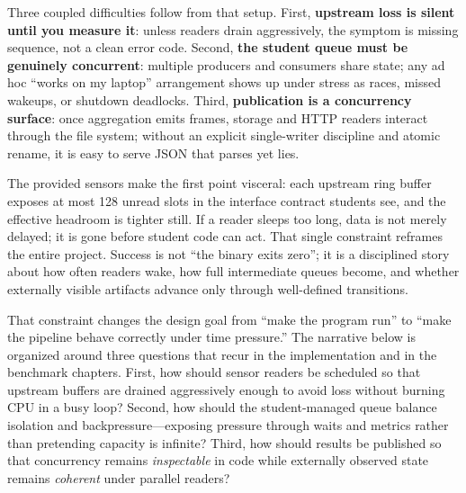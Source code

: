 \documentclass[11pt]{article}
\begin{document}
Three coupled difficulties follow from that setup. First, \textbf{upstream loss is silent until you measure it}: unless readers drain aggressively, the symptom is missing sequence, not a clean error code. Second, \textbf{the student queue must be genuinely concurrent}: multiple producers and consumers share state; any ad hoc ``works on my laptop'' arrangement shows up under stress as races, missed wakeups, or shutdown deadlocks. Third, \textbf{publication is a concurrency surface}: once aggregation emits frames, storage and HTTP readers interact through the file system; without an explicit single-writer discipline and atomic rename, it is easy to serve JSON that parses yet lies.

The provided sensors make the first point visceral: each upstream ring buffer exposes at most 128 unread slots in the interface contract students see, and the effective headroom is tighter still. If a reader sleeps too long, data is not merely delayed; it is gone before student code can act. That single constraint reframes the entire project. Success is not ``the binary exits zero''; it is a disciplined story about how often readers wake, how full intermediate queues become, and whether externally visible artifacts advance only through well-defined transitions.

That constraint changes the design goal from ``make the program run'' to ``make the pipeline behave correctly under time pressure.'' The narrative below is organized around three questions that recur in the implementation and in the benchmark chapters. First, how should sensor readers be scheduled so that upstream buffers are drained aggressively enough to avoid loss without burning CPU in a busy loop? Second, how should the student-managed queue balance isolation and backpressure---exposing pressure through waits and metrics rather than pretending capacity is infinite? Third, how should results be published so that concurrency remains \emph{inspectable} in code while externally observed state remains \emph{coherent} under parallel readers?
\end{document}
